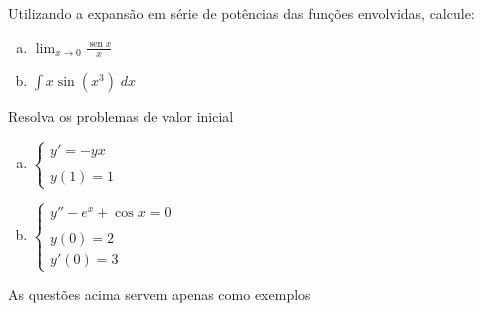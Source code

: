 \documentclass[a4paper, 12pt, addpoints]{exam}
\begin{document}
\begin{questions}
\question[1\half] Utilizando a expansão em série de potências das funções envolvidas, calcule:
\begin{multicols}{2}
\begin{enumerate}[a)]
\item $\lim _{x \rightarrow 0} \frac{\operatorname{sen} x}{x}$
\item $\int x\sin(x^3)\;dx$
\end{enumerate}
\end{multicols}
\question[2] Resolva os problemas de valor inicial
\begin{multicols}{2}
\begin{enumerate}[a)]
    \item $\left\{\begin{array}{l} y'=-yx\\\\ y(1) = 1\end{array}\right.$
    \item $\left\{\begin{array}{l} y''-e^x+\cos x=0\\\\y(0)=2\\ y'(0)=3\end{array}\right.$
\end{enumerate}
\end{multicols}
\question[2] As questões acima servem apenas como exemplos

\end{questions}
\end{document}
